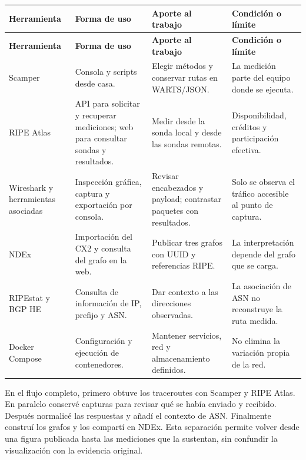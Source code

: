 \begingroup
\fontsize{9}{11}\selectfont
\addtocounter{table}{-1}
\begin{longtable}{p{2.1cm}p{3.4cm}p{5.0cm}p{4.2cm}}
\toprule
\textbf{Herramienta} & \textbf{Forma de uso} & \textbf{Aporte al trabajo} & \textbf{Condición o límite} \\ \midrule
\endfirsthead
\toprule
\textbf{Herramienta} & \textbf{Forma de uso} & \textbf{Aporte al trabajo} & \textbf{Condición o límite} \\ \midrule
\endhead
Scamper & Consola y scripts desde casa. & Elegir métodos y conservar rutas en WARTS/JSON. & La medición parte del equipo donde se ejecuta. \\
RIPE Atlas & API para solicitar y recuperar mediciones; web para consultar sondas y resultados. & Medir desde la sonda local y desde las sondas remotas. & Disponibilidad, créditos y participación efectiva. \\
Wireshark y herramientas asociadas & Inspección gráfica, captura y exportación por consola. & Revisar encabezados y payload; contrastar paquetes con resultados. & Solo se observa el tráfico accesible al punto de captura. \\
NDEx & Importación del CX2 y consulta del grafo en la web. & Publicar tres grafos con UUID y referencias RIPE. & La interpretación depende del grafo que se carga. \\
RIPEstat y BGP HE & Consulta de información de IP, prefijo y ASN. & Dar contexto a las direcciones observadas. & La asociación de ASN no reconstruye la ruta medida. \\
Docker Compose & Configuración y ejecución de contenedores. & Mantener servicios, red y almacenamiento definidos. & No elimina la variación propia de la red. \\
\bottomrule
\end{longtable}
\endgroup

En el flujo completo, primero obtuve los traceroutes con Scamper y RIPE Atlas. En paralelo conservé capturas para revisar qué se había enviado y recibido. Después normalicé las respuestas y añadí el contexto de ASN. Finalmente construí los grafos y los compartí en NDEx. Esta separación permite volver desde una figura publicada hasta las mediciones que la sustentan, sin confundir la visualización con la evidencia original.
